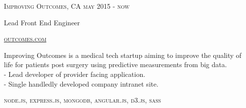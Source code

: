 {
    \textsc{\small{Improving Outcomes, CA
        \hfill
        {\raggedleft
            may 2015 - now
        } \\
        }
    }
    {\raggedright\large {
        Lead Front End Engineer
    } \\}

    \textsc{\small\href{http://www.outcomes.com}{outcomes.com}}

    \normalsize{
        Improving Outcomes is a medical tech startup aiming to improve the quality of life for patients post surgery using predictive measurements from big data. \\
        - Lead developer of provider facing application. \\
        - Single handledly developed company intranet site.
    }

    \textsc{\small{\color{highlight}
        node.js,
        express.js,
        mongodb,
        angular.js,
        d3.js,
        sass
    }}
}
